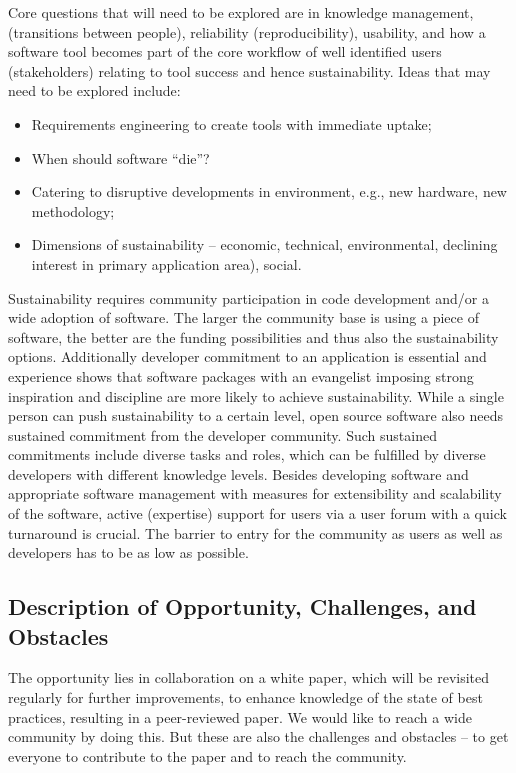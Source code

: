 Core questions that will need to be explored are in knowledge management, 
(transitions between people), reliability (reproducibility), usability, and how a software tool becomes part of the core workflow of well identified users (stakeholders)
relating to tool success and hence sustainability.  Ideas 
that may need to be explored include:
\begin{itemize}
\item Requirements engineering to create tools with immediate uptake;
\item When should software ``die''?
\item Catering to disruptive developments in environment, e.g., new hardware, new methodology;
\item Dimensions of sustainability -- economic, technical, environmental, 
declining interest in primary application area),  social.
\end{itemize}

Sustainability requires community participation in code development and/or a wide adoption of software.
The larger the community base is using a piece of software, the better are the funding possibilities and thus also the sustainability options.
Additionally developer commitment to an application is essential and experience shows that software packages with an evangelist imposing strong inspiration and discipline are more likely to achieve sustainability.
While a single person can push sustainability to a certain level, open source software also needs sustained commitment from the developer community.
Such sustained commitments include diverse tasks and roles, which can be fulfilled by diverse developers with different knowledge levels.
Besides developing software and appropriate software management with measures for extensibility and scalability of the software, active (expertise) support for users via a user forum with a quick turnaround is crucial.
The barrier to entry for the community as users as well as developers has to be as low as possible.

\subsection{Description of Opportunity, Challenges, and Obstacles}

The opportunity lies in collaboration on a white paper, which will be revisited regularly for further improvements, to enhance knowledge of the state of best practices, resulting in a peer-reviewed paper. We would like to reach a wide community by doing this. But these are also the challenges and obstacles -- to get everyone to contribute to the paper and to reach the community.

